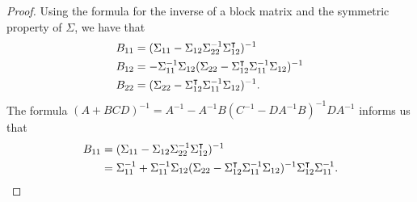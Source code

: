 \documentclass[12pt]{article}
\theoremstyle{definition}
\begin{document}
\begin{proof}
   Using the formula for the inverse of a block matrix and the symmetric property
   of $\Sigma$, we have that
   \begin{align}\label{inverse}
     B_{11} &= (\Sigma_{11} - \Sigma_{12}\Sigma_{22}^{-1}\Sigma_{12}^\intercal)^{-1} \notag \\
     B_{12} &= -\Sigma_{11}^{-1}\Sigma_{12}(\Sigma_{22} - \Sigma_{12}^\intercal\Sigma_{11}^{-1}\Sigma_{12})^{-1} \notag \\
     B_{22} &= (\Sigma_{22} - \Sigma_{12}^\intercal\Sigma_{11}^{-1}\Sigma_{12})^{-1}.
   \end{align}
   The formula $(A + BCD)^{-1} = A^{-1} - A^{-1}B(C^{-1} - DA^{-1}B)^{-1}DA^{-1}$ informs
   us that
   \begin{align}\label{b11_inverse}
     B_{11}
     &= (\Sigma_{11} - \Sigma_{12}\Sigma_{22}^{-1}\Sigma_{12}^\intercal)^{-1} \notag \\
     &= \Sigma_{11}^{-1} + \Sigma_{11}^{-1} \Sigma_{12} (\Sigma_{22} - \Sigma_{12}^\intercal\Sigma_{11}^{-1}\Sigma_{12})^{-1} \Sigma_{12}^\intercal \Sigma_{11}^{-1}.
   \end{align}


\end{proof}
\end{document}
